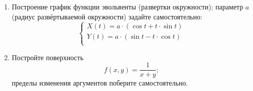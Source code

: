 \begin{enumerate}
\begin{figure}[H]
    \end{figure}
    \item Построение график функции эвольвенты (развертки окружности); параметр $a$ (радиус развёртываемой окружности)
    задайте самостоятельно:
    \[
        \begin{cases}
            X(t) = a\cdot(\cos t + t\cdot\sin t) \\
            Y(t) = a\cdot(\sin t - t\cdot\cos t) \\
        \end{cases}
    \]
    \begin{figure}[H]
        \renewcommand{\figurename}{Рисунок}
        \label{fig:image_self_2_3}
    \end{figure}
    \item Постройте поверхность \[f(x,y) = \frac{1}{x+y};\]
    пределы изменения аргументов поберите самостоятельно.
    \begin{figure}[H]
        \renewcommand{\figurename}{Рисунок}
        \label{fig:image_self_2_4}
    \end{figure}
\end{enumerate}